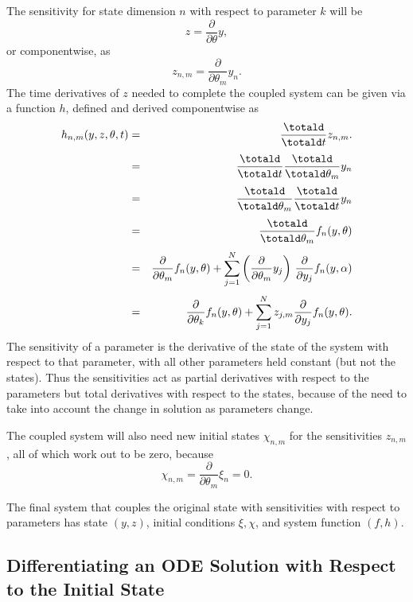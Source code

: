 \documentclass[10pt]{article}
\begin{document}
The sensitivity for state dimension $n$ with respect to parameter $k$
will be
\[
z = \frac{\partial}{\partial \theta} y,
\]
or componentwise, as
\[
z_{n,m} = \frac{\partial}{\partial \theta_m} y_n.
\]
%
The time derivatives of $z$ needed to complete the coupled system can
be given via a function $h$, defined and derived componentwise as
%
\begin{eqnarray*}
h_{n,m}(y,z,\theta,t)
& = & \frac{\totald}{\totald t} z_{n,m}.
\\[3pt]
& = &
\frac{\totald}{\totald t} \frac{\totald}{\totald \theta_m} y_n
\\[3pt]
& = &
\frac{\totald}{\totald \theta_m} \frac{\totald}{\totald t} y_n
\\[3pt]
& = & 
\frac{\totald}{\totald \theta_m} f_n(y,\theta)
\\[3pt]
& = & 
\frac{\partial}{\partial \theta_m} f_n(y,\theta)
+ \sum_{j = 1}^N \left( \frac{\partial}{\partial \theta_m} y_j \right) \, 
         \frac{\partial}{\partial y_j} f_n(y,\alpha)
\\[3pt]
& = & 
\frac{\partial}{\partial \theta_k} f_n(y,\theta)
+ \sum_{j=1}^N z_{j,m} \frac{\partial}{\partial y_j} f_n(y,\theta).
\end{eqnarray*}
%
The sensitivity of a parameter is the derivative of the state of the
system with respect to that parameter, with all other parameters held
constant (but not the states).  Thus the sensitivities act as partial
derivatives with respect to the parameters but total derivatives with
respect to the states, because of the need to take into account the
change in solution as parameters change.

The coupled system will also need new initial states $\chi_{n,m}$ for
the sensitivities $z_{n,m}$, all of which work out to be zero, because
\[
\chi_{n,m} = \frac{\partial}{\partial \theta_m} \xi_n = 0.
\]

The final system that couples the original state with sensitivities
with respect to parameters has state $(y,z)$, initial conditions
$\xi,\chi$, and system function $(f,h)$.

\subsection{Differentiating an ODE Solution with Respect to the Initial State}
\end{document}
